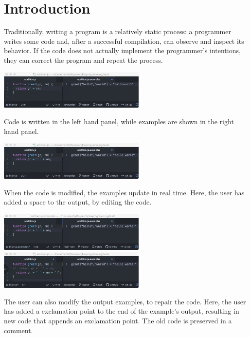 \vspace{-8pt}
\section{Introduction}
\label{sec:intro}


Traditionally, writing a program is a relatively static process: a programmer writes some code and, after a successful compilation, can observe and inspect its behavior. If the code does not actually implement the programmer's intentions, they can correct the program and repeat the process.

\begin{marginfigure}
	\setlength{\abovecaptionskip}{0.1pt plus 0.1pt minus 0.1pt}
	\includegraphics[width=0.55\textwidth]{figures/initial_greet}
	\caption{Code is written in the left hand panel,
	while examples are shown in the right hand panel.}
	\label{fig:init}
\end{marginfigure}
\begin{marginfigure}
	\setlength{\abovecaptionskip}{0.1pt plus 0.1pt minus 0.1pt}
	\includegraphics[width=0.55\textwidth]{figures/manual_change}
	\caption{When the code is modified, the examples update in real time.
	Here, the user has added a space to the output, by editing the code.}
	\label{fig:man_change}
\end{marginfigure}
\begin{marginfigure}
	\setlength{\abovecaptionskip}{0.1pt plus 0.1pt minus 0.1pt}
	\includegraphics[width=0.55\textwidth]{figures/pbe_before}
	\includegraphics[width=0.55\textwidth]{figures/pbe_after}
	\caption{The user can also modify the output examples, to repair the code.  Here, the
	user has added a exclamation point to the end of the example's output, resulting in new code that appends an exclamation point.  The old code is preserved in a comment.}
	\label{fig:pbe}
\end{marginfigure}

